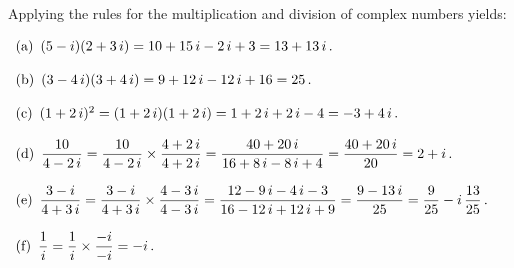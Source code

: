 Applying the rules for the multiplication and division of
  complex numbers yields:

$
\begin{array}[h!]{lll}
{\rm (a)}\hskip5pt (5-i)(2+3\,i)=10+15\,i-2\,i+3=13+13\,i\, .\\
\noalign{\vskip12pt}
{\rm (b)}\hskip5pt (3-4\,i)(3+4\,i)=9+12\,i-12\,i+16=25\, .\\
\noalign{\vskip12pt}
{\rm (c)}\hskip5pt (1+2\,i)^2=(1+2\,i)(1+2\,i)=1+2\,i+2\,i-4=-3+4\,i\, .\\
\noalign{\vskip12pt}
{\rm (d)}\hskip5pt \displaystyle{{10\over4-2\,i}={10\over4-2\,i}\times{4+2\,i\over4+2\,i}=
{40+20\,i\over16+8\,i-8\,i+4}={40+20\,i\over20}=2+i\, .}\\
\noalign{\vskip12pt}
{\rm (e)}\hskip5pt \displaystyle{{3-i\over4+3\,i}={3-i\over4+3\,i}\times{4-3\,i\over4-3\,i}=
{12-9\,i-4\,i-3\over16-12\,i+12\,i+9}={9-13\,i\over25}={9\over25}-i\,{13\over25}\, .}\\
\noalign{\vskip12pt}
{\rm (f)}\hskip5pt \displaystyle{{1\over i}={1\over i}\times{-i\over-i}=-i\, .}
\end{array}
$